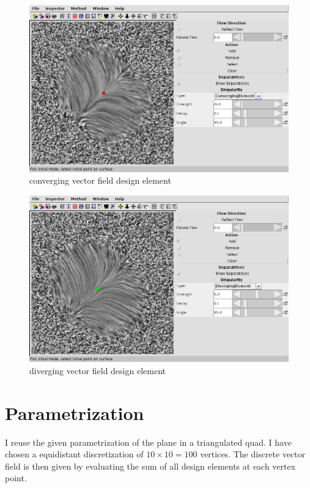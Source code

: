 \documentclass[a4paper,10pt,notitlepage]{scrreprt}
\begin{document}
\begin{figure}
  \centering
  \includegraphics[scale=0.5]{img-3-2/converging.png}
  \caption{converging vector field design element}
  \label{fig:converging}
\end{figure}

\begin{figure}
  \centering
  \includegraphics[scale=0.5]{img-3-2/diverging.png}
  \caption{diverging vector field design element}
  \label{fig:diverging}
\end{figure}

\section{Parametrization}

I reuse the given parametrization of the plane in a triangulated quad. I have
chosen a equidistant discretization of $10 \times 10 = 100$ vertices. The
discrete vector field is then given by evaluating the sum of all design
elements at each vertex point.
\end{document}
